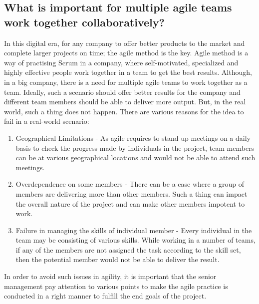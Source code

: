 \documentclass[sigplan,screen]{acmart}
\begin{document}
\subsection{What is important for multiple agile teams work together collaboratively?}
In this digital era, for any company to offer better products to the market and complete larger projects on time; the agile method is the key. Agile method is a way of practising Scrum in a company, where self-motivated, specialized and highly effective people work together in a team to get the best results. Although, in a big company, there is a need for multiple agile teams to work together as a team. Ideally, such a scenario should offer better results for the company and different team members should be able to deliver more output. But, in the real world, such a thing does not happen. There are various reasons for the idea to fail in a real-world scenario:
\begin{enumerate}
\item Geographical Limitations \cite{Cross18} - As agile requires to stand up meetings on a daily basis to check the progress made by individuals in the project, team members can be at various geographical locations and would not be able to attend such meetings.
\item Overdependence on some members \cite{Cross18} - There can be a case where a group of members are delivering more than other members. Such a thing can impact the overall nature of the project and can make other members impotent to work.
\item Failure in managing the skills of individual member \cite{Cross18} - Every individual in the team may be consisting of various skills. While working in a number of teams, if any of the members are not assigned the task according to the skill set, then the potential member would not be able to deliver the result.
\end{enumerate}
In order to avoid such issues in agility, it is important that the senior management pay attention to various points to make the agile practice is conducted in a right manner to fulfill the end goals of the project.
\end{document}
